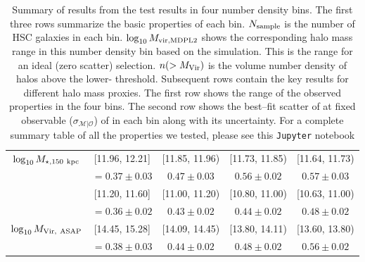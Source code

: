\begin{table*}
{\begin{tabular}{|c|cccc|}
\multirow{2}{*}{$\log_{10} M_{\star, 150\ \rm kpc}$} & [11.96, 12.21] & [11.85, 11.96) & [11.73, 11.85) & [11.64, 11.73)  \\ 
& \sigmvir{}$=0.37\pm0.03$ & $0.47\pm0.03$ & $0.56\pm0.02$ & $0.57\pm0.03$ \\ \hhline{|=====|}

\multirow{2}{*}{$\log_{10} M_{\star, [50, 100]}$} & [11.20, 11.60] & [11.00, 11.20) & [10.80, 11.00) & [10.63, 11.00)  \\ 
& \sigmvir{}$=0.36\pm0.02$ & $0.43\pm0.02$ & $0.44\pm0.02$ & $0.48\pm0.02$ \\ \hline

\multirow{2}{*}{$\log_{10} M_{\rm Vir,\ ASAP}$} & [14.45, 15.28] & [14.09, 14.45) & [13.80, 14.11) & [13.60, 13.80)  \\ 
& \sigmvir{}$=0.38\pm0.03$ & $0.44\pm0.02$ & $0.48\pm0.02$ & $0.56\pm0.02$ \\ \hline

\end{tabular}%
}
\caption{
	Summary of results from the \topn{} test results in four number density bins. 
	The first three rows summarize the basic properties of each bin.
	$N_{\rm sample}$ is the number of HSC galaxies in each bin. 
	$\log_{10}M_{\rm vir, MDPL2}$ shows the corresponding halo mass range in this number density bin
	based on the  simulation. 
	This is the \mvir{} range for an ideal (zero scatter) \topn{} selection.
	$n(>M_{\rm Vir})$ is the volume number density of halos above the lower-\mvir{} threshold.
	Subsequent rows contain the key results for different halo mass proxies. 
	The first row shows the range of the observed properties in the four bins.  The second row shows
	the best--fit scatter of \mvir{} at fixed observable ($\sigma_{\mathcal{M}|\mathcal{O}}$) of
	\mvir{} in each bin along with its uncertainty.
	For a complete summary table of all the properties we tested, please see this \texttt{Jupyter} notebook \href{https://github.com/dr-guangtou/jianbing/blob/master/notebooks/topn_result_summary.ipynb}{\faGithub} 
	}
\label{tab:summary}
\end{table*}